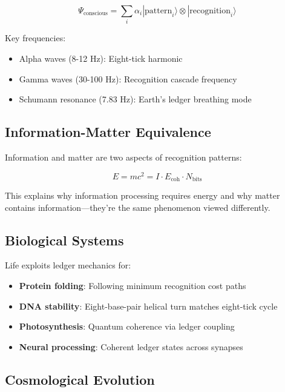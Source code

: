 \documentclass[12pt,a4paper]{article}
\newcommand{\Ecoh}{E_{\text{coh}}}
\theoremstyle{definition}
\begin{document}
\begin{equation}
    \Psi_{\text{conscious}} = \sum_i \alpha_i |\text{pattern}_i\rangle \otimes |\text{recognition}_i\rangle
\end{equation}

Key frequencies:
\begin{itemize}
    \item Alpha waves (8-12 Hz): Eight-tick harmonic
    \item Gamma waves (30-100 Hz): Recognition cascade frequency
    \item Schumann resonance (7.83 Hz): Earth's ledger breathing mode
\end{itemize}

\subsection{Information-Matter Equivalence}

Information and matter are two aspects of recognition patterns:

\begin{equation}
    E = mc^2 = I \cdot \Ecoh \cdot N_{\text{bits}}
\end{equation}

This explains why information processing requires energy and why matter contains information—they're the same phenomenon viewed differently.

\subsection{Biological Systems}

Life exploits ledger mechanics for:
\begin{itemize}
    \item \textbf{Protein folding}: Following minimum recognition cost paths
    \item \textbf{DNA stability}: Eight-base-pair helical turn matches eight-tick cycle
    \item \textbf{Photosynthesis}: Quantum coherence via ledger coupling
    \item \textbf{Neural processing}: Coherent ledger states across synapses
\end{itemize}

\subsection{Cosmological Evolution}
\end{document}
